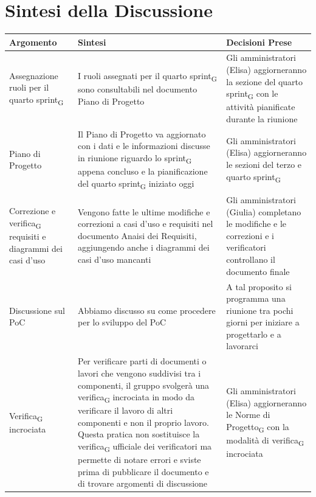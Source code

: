 \documentclass[a4paper,12pt]{article}
\newcommand{\gls}[1]{#1\textsubscript{G}}
\begin{document}
\section*{ Sintesi della Discussione}

\begin{longtable}{|p{}|p{}|p{}|}
\hline
\textbf{Argomento} & \textbf{Sintesi} & \textbf{Decisioni Prese} \\ \hline

Assegnazione ruoli per il quarto \gls{sprint} & I ruoli assegnati per il quarto \gls{sprint} sono consultabili nel documento Piano di Progetto & Gli amministratori (Elisa) aggiorneranno la sezione del quarto \gls{sprint} con le attività pianificate durante la riunione\\ \hline

Piano di Progetto & Il Piano di Progetto va aggiornato con i dati e le informazioni discusse in riunione riguardo lo \gls{sprint} appena concluso e la pianificazione del quarto \gls{sprint} iniziato oggi & Gli amministratori (Elisa) aggiorneranno le sezioni del terzo e quarto \gls{sprint} \\ \hline

Correzione e \gls{verifica} requisiti e diagrammi dei casi d'uso & Vengono fatte le ultime modifiche e correzioni a casi d'uso e requisiti nel documento Anaisi dei Requisiti, aggiungendo anche i diagrammi dei casi d'uso mancanti & Gli amministratori (Giulia) completano le modifiche e le correzioni e i verificatori controllano il documento finale \\ \hline

Discussione sul PoC & Abbiamo discusso su come procedere per lo sviluppo del PoC & A tal proposito si programma una riunione tra pochi giorni per iniziare a progettarlo e a lavorarci\\ \hline

\gls{Verifica} incrociata & Per verificare parti di documenti o lavori che vengono suddivisi tra i componenti, il gruppo svolgerà una \gls{verifica} incrociata in modo da verificare il lavoro di altri componenti e non il proprio lavoro. Questa pratica non sostituisce la \gls{verifica} ufficiale dei verificatori ma permette di notare errori e sviste prima di pubblicare il documento e di trovare argomenti di discussione & Gli amministratori (Elisa) aggiorneranno le \gls{Norme di Progetto} con la modalità di \gls{verifica} incrociata \\ \hline

\end{longtable}
\end{document}
